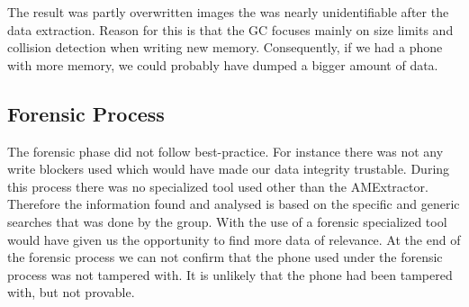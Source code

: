 The result was partly overwritten images the was nearly unidentifiable after the data extraction. Reason for this is that the GC focuses mainly on size limits and collision detection when writing new memory. Consequently, if we had a phone with more memory, we could probably have dumped a bigger amount of data.
\subsection{Forensic Process}
The forensic phase did not follow best-practice. For instance there was not any write blockers used which would have made our data integrity trustable. During this process there was no specialized tool used other than the AMExtractor. Therefore the information found and analysed is based on the specific and generic searches that was done by the group. With the use of a forensic specialized tool would have given us the opportunity to find more data of relevance. At the end of the forensic process we can not confirm that the phone used under the forensic process was not tampered with. It is unlikely that the phone had been tampered with, but not provable.